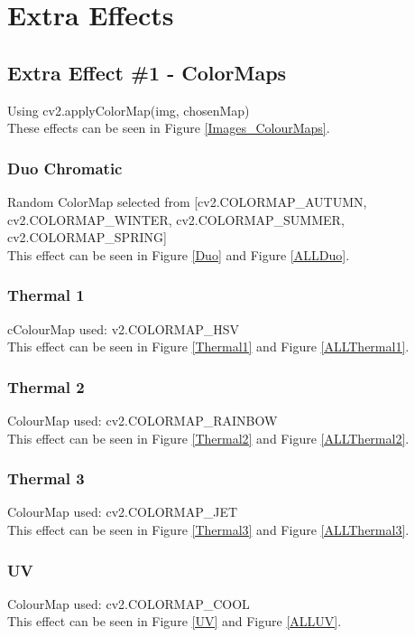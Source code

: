 \documentclass[a4paper,10pt]{report}
\begin{document}
	
	\section{Extra Effects}\label{ExtraEffectsChapter}
	\subsection{Extra Effect \#1 - ColorMaps}
	Using cv2.applyColorMap(img, chosenMap)\\
	These effects can be seen in Figure \ref{Images_ColourMaps}.
	\subsubsection{Duo Chromatic}
	Random ColorMap selected from [cv2.COLORMAP\_AUTUMN, cv2.COLORMAP\_WINTER, cv2.COLORMAP\_SUMMER, cv2.COLORMAP\_SPRING]\\
	This effect can be seen in Figure \ref{Duo} and Figure \ref{ALLDuo}.
	\subsubsection{Thermal 1}
	cColourMap used: v2.COLORMAP\_HSV\\
	This effect can be seen in Figure \ref{Thermal1} and Figure \ref{ALLThermal1}.
	\subsubsection{Thermal 2}
	ColourMap used: cv2.COLORMAP\_RAINBOW\\
	This effect can be seen in Figure \ref{Thermal2} and Figure \ref{ALLThermal2}.
	\subsubsection{Thermal 3}
	ColourMap used: cv2.COLORMAP\_JET\\
	This effect can be seen in Figure \ref{Thermal3} and Figure \ref{ALLThermal3}.
	\subsubsection{UV}
	ColourMap used: cv2.COLORMAP\_COOL\\
	This effect can be seen in Figure \ref{UV} and Figure \ref{ALLUV}.
	
\end{document}
